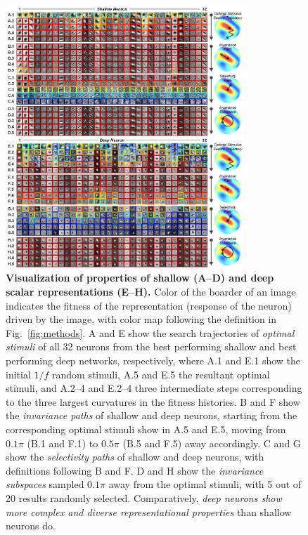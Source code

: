 \documentclass[10pt,twocolumn,letterpaper]{article}
\begin{document}
\begin{figure}
\begin{center}
\includegraphics[width=0.80\textwidth]{Figs/pic1.jpg} 
\end{center}
\caption{{\bf Visualization of properties of shallow (A--D) and deep scalar representations (E--H).}
Color of the boarder of an image indicates the fitness of the representation (\ie response of the neuron) driven by the image, with color map following the definition in Fig.~\ref{fig:methods}.
A and E show the search trajectories of \emph{optimal stimuli} of all 32 neurons from the best performing shallow and best performing deep networks, respectively, where A.1 and E.1 show the initial $1/f$ random stimuli, A.5 and E.5 the resultant optimal stimuli, and A.2--4 and E.2--4 three intermediate steps corresponding to the three largest curvatures in the fitness histories.
B and F show the \emph{invariance paths} of shallow and deep neurons, starting from the corresponding optimal stimuli show in A.5 and E.5, moving from $0.1\pi$ (B.1 and F.1) to $0.5\pi$ (B.5 and F.5) away accordingly.
C and G show the \emph{selectivity paths} of shallow and deep neurons, with definitions following B and F.
D and H show the \emph{invariance subspaces} sampled $0.1\pi$ away from the optimal stimuli, with 5 out of 20 results randomly selected.
Comparatively, \emph{deep neurons show more complex and diverse representational properties} than shallow neurons do.
} %
\label{fig:allrep}
\end{figure}
\end{document}
